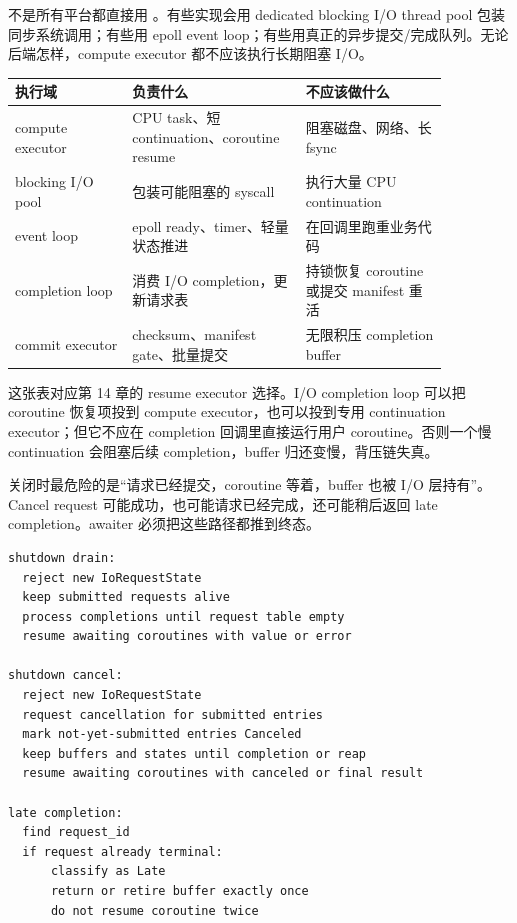 不是所有平台都直接用 。有些实现会用 dedicated blocking I/O thread pool 包装同步系统调用；有些用 epoll event loop；有些用真正的异步提交/完成队列。无论后端怎样，compute executor 都不应该执行长期阻塞 I/O。

\begin{center}
\small
\begin{tabular}{p{0.23\linewidth}p{0.34\linewidth}p{0.29\linewidth}}
\toprule
执行域 & 负责什么 & 不应该做什么 \\
\midrule
compute executor & CPU task、短 continuation、coroutine resume & 阻塞磁盘、网络、长 fsync \\
blocking I/O pool & 包装可能阻塞的 syscall & 执行大量 CPU continuation \\
event loop & epoll ready、timer、轻量状态推进 & 在回调里跑重业务代码 \\
completion loop & 消费 I/O completion，更新请求表 & 持锁恢复 coroutine 或提交 manifest 重活 \\
commit executor & checksum、manifest gate、批量提交 & 无限积压 completion buffer \\
\bottomrule
\end{tabular}
\end{center}

这张表对应第 14 章的 resume executor 选择。I/O completion loop 可以把 coroutine 恢复项投到 compute executor，也可以投到专用 continuation executor；但它不应在 completion 回调里直接运行用户 coroutine。否则一个慢 continuation 会阻塞后续 completion，buffer 归还变慢，背压链失真。

关闭时最危险的是“请求已经提交，coroutine 等着，buffer 也被 I/O 层持有”。Cancel request 可能成功，也可能请求已经完成，还可能稍后返回 late completion。awaiter 必须把这些路径都推到终态。

\begin{lstlisting}[numbers=none,caption={I/O awaiter 取消和关闭路径}]
shutdown drain:
  reject new IoRequestState
  keep submitted requests alive
  process completions until request table empty
  resume awaiting coroutines with value or error

shutdown cancel:
  reject new IoRequestState
  request cancellation for submitted entries
  mark not-yet-submitted entries Canceled
  keep buffers and states until completion or reap
  resume awaiting coroutines with canceled or final result

late completion:
  find request_id
  if request already terminal:
      classify as Late
      return or retire buffer exactly once
      do not resume coroutine twice
\end{lstlisting}

